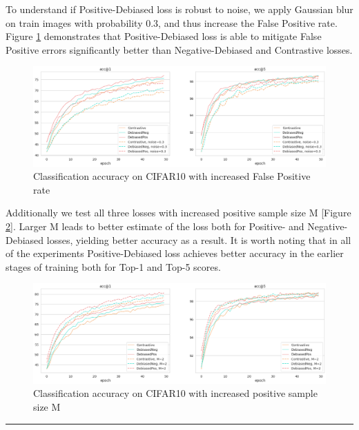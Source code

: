 \documentclass{article}
\begin{document}
To understand if Positive-Debiased loss is robust to noise, we apply Gaussian blur on train images with probability 0.3, and thus increase the False Positive rate. Figure \ref{fig:fig4} demonstrates that Positive-Debiased loss is able to mitigate False Positive errors significantly better than Negative-Debiased and Contrastive losses.

\begin{figure}
\includegraphics[width=1\textwidth]{figures/base_vs_noise.png}
\caption{Classification accuracy on CIFAR10 with increased False Positive rate}
\label{fig:fig4}
\end{figure}

Additionally we test all three losses with increased positive sample size M [Figure \ref{fig:fig5}]. Larger M leads to better estimate of the loss both for Positive- and Negative-Debiased losses, yielding better accuracy as a result. It is worth noting that in all of the experiments Positive-Debiased loss achieves better accuracy in the earlier stages of training both for Top-1 and Top-5 scores.
\begin{figure}
\includegraphics[width=1\textwidth]{figures/base_vs_M=2.png}
\caption{Classification accuracy on CIFAR10 with increased positive sample size M}
\label{fig:fig5}
\end{figure}

\noindent\rule{16cm}{0.4pt}


\end{document}

